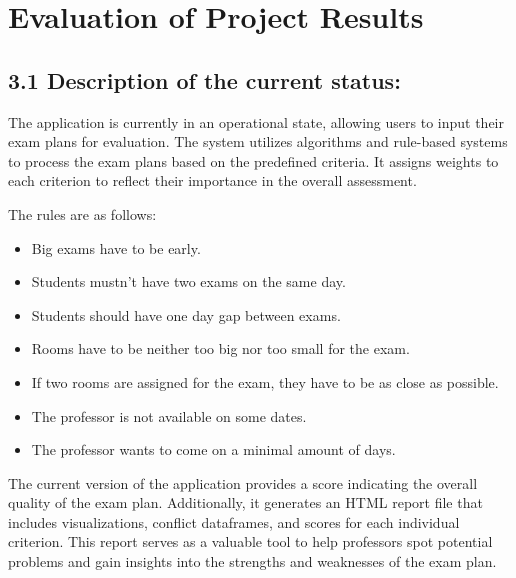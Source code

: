\section{Evaluation of Project Results}
\subsection{3.1 Description of the current status:}

The application is currently in an operational state, allowing users to input their exam plans for evaluation. The system utilizes algorithms and rule-based systems to process the exam plans based on the predefined criteria. It assigns weights to each criterion to reflect their importance in the overall assessment.


\vspace{\baselineskip}


The rules are as follows:

\begin{itemize}
\item Big exams have to be early.
\item Students mustn't have two exams on the same day.
\item Students should have one day gap between exams.
\item Rooms have to be neither too big nor too small for the exam.
\item If two rooms are assigned for the exam, they have to be as close as possible.
\item The professor is not available on some dates.
\item The professor wants to come on a minimal amount of days.
\end{itemize}

The current version of the application provides a score indicating the overall quality of the exam plan. Additionally, it generates an HTML report file that includes visualizations, conflict dataframes, and scores for each individual criterion. This report serves as a valuable tool to help professors spot potential problems and gain insights into the strengths and weaknesses of the exam plan.